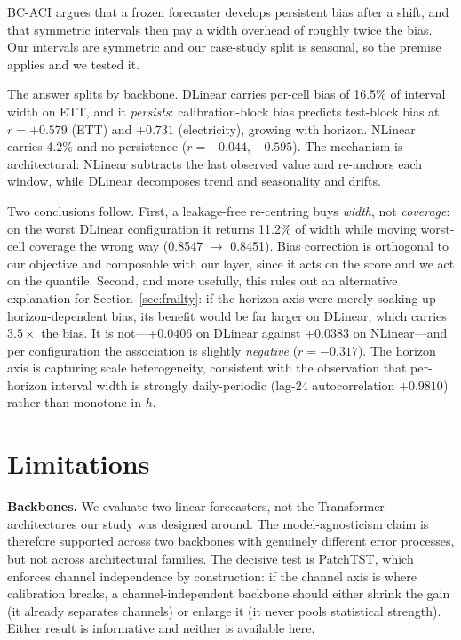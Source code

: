 \documentclass[11pt]{article}
\begin{document}
BC-ACI \citep{bcaci} argues that a frozen forecaster develops persistent bias after a shift, and that symmetric intervals then pay a width overhead of roughly twice the bias. Our intervals are symmetric and our case-study split is seasonal, so the premise applies and we tested it.

The answer splits by backbone. DLinear carries per-cell bias of 16.5\% of interval width on ETT, and it \emph{persists}: calibration-block bias predicts test-block bias at $r=+0.579$ (ETT) and $+0.731$ (electricity), growing with horizon. NLinear carries 4.2\% and no persistence ($r=-0.044$, $-0.595$). The mechanism is architectural: NLinear subtracts the last observed value and re-anchors each window, while DLinear decomposes trend and seasonality and drifts.

Two conclusions follow. First, a leakage-free re-centring buys \emph{width}, not \emph{coverage}: on the worst DLinear configuration it returns 11.2\% of width while moving worst-cell coverage the wrong way (0.8547 $\rightarrow$ 0.8451). Bias correction is orthogonal to our objective and composable with our layer, since it acts on the score and we act on the quantile. Second, and more usefully, this rules out an alternative explanation for Section~\ref{sec:frailty}: if the horizon axis were merely soaking up horizon-dependent bias, its benefit would be far larger on DLinear, which carries $3.5\times$ the bias. It is not---$+0.0406$ on DLinear against $+0.0383$ on NLinear---and per configuration the association is slightly \emph{negative} ($r=-0.317$). The horizon axis is capturing scale heterogeneity, consistent with the observation that per-horizon interval width is strongly daily-periodic (lag-24 autocorrelation $+0.9810$) rather than monotone in $h$.

\section{Limitations}\label{sec:limitations}

\textbf{Backbones.} We evaluate two linear forecasters, not the Transformer architectures our study was designed around. The model-agnosticism claim is therefore supported across two backbones with genuinely different error processes, but not across architectural families. The decisive test is PatchTST, which enforces channel independence by construction: if the channel axis is where calibration breaks, a channel-independent backbone should either shrink the gain (it already separates channels) or enlarge it (it never pools statistical strength). Either result is informative and neither is available here.
\end{document}
